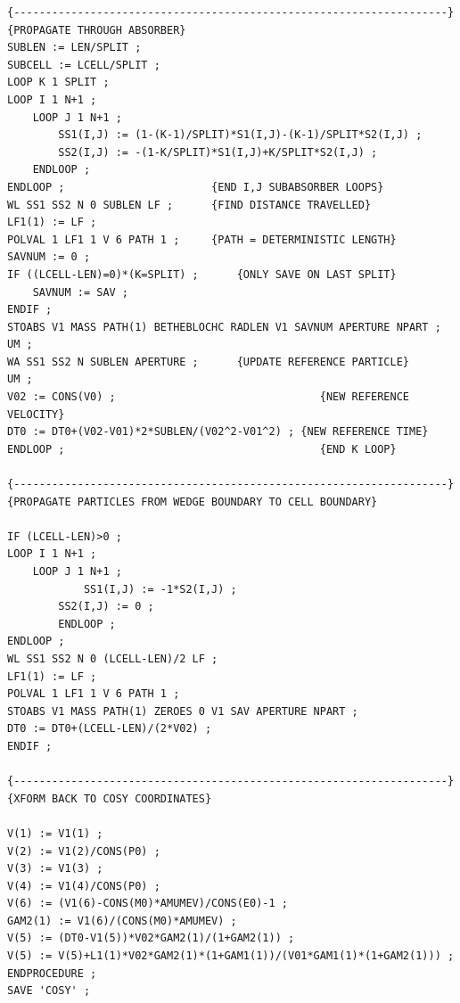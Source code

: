 \begin{lstlisting}
{--------------------------------------------------------------------}
{PROPAGATE THROUGH ABSORBER}
SUBLEN := LEN/SPLIT ; 
SUBCELL := LCELL/SPLIT ;
LOOP K 1 SPLIT ; 
LOOP I 1 N+1 ;  
    LOOP J 1 N+1 ;
        SS1(I,J) := (1-(K-1)/SPLIT)*S1(I,J)-(K-1)/SPLIT*S2(I,J) ;
        SS2(I,J) := -(1-K/SPLIT)*S1(I,J)+K/SPLIT*S2(I,J) ; 
    ENDLOOP ; 
ENDLOOP ;                       {END I,J SUBABSORBER LOOPS}
WL SS1 SS2 N 0 SUBLEN LF ;      {FIND DISTANCE TRAVELLED}
LF1(1) := LF ; 
POLVAL 1 LF1 1 V 6 PATH 1 ;     {PATH = DETERMINISTIC LENGTH}
SAVNUM := 0 ; 
IF ((LCELL-LEN)=0)*(K=SPLIT) ;      {ONLY SAVE ON LAST SPLIT}
    SAVNUM := SAV ; 
ENDIF ;
STOABS V1 MASS PATH(1) BETHEBLOCHC RADLEN V1 SAVNUM APERTURE NPART ;
UM ;
WA SS1 SS2 N SUBLEN APERTURE ;      {UPDATE REFERENCE PARTICLE}
UM ; 
V02 := CONS(V0) ;                                {NEW REFERENCE VELOCITY}
DT0 := DT0+(V02-V01)*2*SUBLEN/(V02^2-V01^2) ; {NEW REFERENCE TIME}
ENDLOOP ;                                        {END K LOOP}

{--------------------------------------------------------------------}
{PROPAGATE PARTICLES FROM WEDGE BOUNDARY TO CELL BOUNDARY}

IF (LCELL-LEN)>0 ;
LOOP I 1 N+1 ; 
    LOOP J 1 N+1 ;
            SS1(I,J) := -1*S2(I,J) ; 
        SS2(I,J) := 0 ;
        ENDLOOP ; 
ENDLOOP ;
WL SS1 SS2 N 0 (LCELL-LEN)/2 LF ; 
LF1(1) := LF ; 
POLVAL 1 LF1 1 V 6 PATH 1 ;
STOABS V1 MASS PATH(1) ZEROES 0 V1 SAV APERTURE NPART ;
DT0 := DT0+(LCELL-LEN)/(2*V02) ;
ENDIF ;

{--------------------------------------------------------------------}
{XFORM BACK TO COSY COORDINATES}

V(1) := V1(1) ; 
V(2) := V1(2)/CONS(P0) ; 
V(3) := V1(3) ; 
V(4) := V1(4)/CONS(P0) ; 
V(6) := (V1(6)-CONS(M0)*AMUMEV)/CONS(E0)-1 ;
GAM2(1) := V1(6)/(CONS(M0)*AMUMEV) ;
V(5) := (DT0-V1(5))*V02*GAM2(1)/(1+GAM2(1)) ;
V(5) := V(5)+L1(1)*V02*GAM2(1)*(1+GAM1(1))/(V01*GAM1(1)*(1+GAM2(1))) ;
ENDPROCEDURE ;
SAVE 'COSY' ;

\end{lstlisting}


